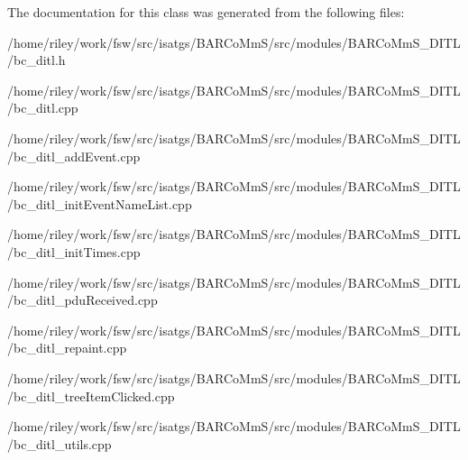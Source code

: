 The documentation for this class was generated from the following files\+:\begin{DoxyCompactItemize}
\item 
/home/riley/work/fsw/src/isatgs/\+B\+A\+R\+Co\+Mm\+S/src/modules/\+B\+A\+R\+Co\+Mm\+S\+\_\+\+D\+I\+T\+L/bc\+\_\+ditl.\+h\item 
/home/riley/work/fsw/src/isatgs/\+B\+A\+R\+Co\+Mm\+S/src/modules/\+B\+A\+R\+Co\+Mm\+S\+\_\+\+D\+I\+T\+L/bc\+\_\+ditl.\+cpp\item 
/home/riley/work/fsw/src/isatgs/\+B\+A\+R\+Co\+Mm\+S/src/modules/\+B\+A\+R\+Co\+Mm\+S\+\_\+\+D\+I\+T\+L/bc\+\_\+ditl\+\_\+add\+Event.\+cpp\item 
/home/riley/work/fsw/src/isatgs/\+B\+A\+R\+Co\+Mm\+S/src/modules/\+B\+A\+R\+Co\+Mm\+S\+\_\+\+D\+I\+T\+L/bc\+\_\+ditl\+\_\+init\+Event\+Name\+List.\+cpp\item 
/home/riley/work/fsw/src/isatgs/\+B\+A\+R\+Co\+Mm\+S/src/modules/\+B\+A\+R\+Co\+Mm\+S\+\_\+\+D\+I\+T\+L/bc\+\_\+ditl\+\_\+init\+Times.\+cpp\item 
/home/riley/work/fsw/src/isatgs/\+B\+A\+R\+Co\+Mm\+S/src/modules/\+B\+A\+R\+Co\+Mm\+S\+\_\+\+D\+I\+T\+L/bc\+\_\+ditl\+\_\+pdu\+Received.\+cpp\item 
/home/riley/work/fsw/src/isatgs/\+B\+A\+R\+Co\+Mm\+S/src/modules/\+B\+A\+R\+Co\+Mm\+S\+\_\+\+D\+I\+T\+L/bc\+\_\+ditl\+\_\+repaint.\+cpp\item 
/home/riley/work/fsw/src/isatgs/\+B\+A\+R\+Co\+Mm\+S/src/modules/\+B\+A\+R\+Co\+Mm\+S\+\_\+\+D\+I\+T\+L/bc\+\_\+ditl\+\_\+tree\+Item\+Clicked.\+cpp\item 
/home/riley/work/fsw/src/isatgs/\+B\+A\+R\+Co\+Mm\+S/src/modules/\+B\+A\+R\+Co\+Mm\+S\+\_\+\+D\+I\+T\+L/bc\+\_\+ditl\+\_\+utils.\+cpp\end{DoxyCompactItemize}

